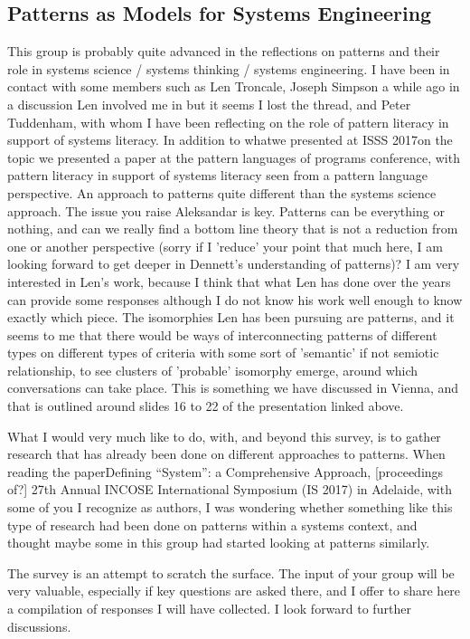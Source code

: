 \subsection{Patterns as Models for Systems Engineering}

This group is probably quite advanced in the reflections on patterns and their role in systems science / systems thinking / systems engineering. I have been in contact with some members such as Len Troncale, Joseph Simpson a while ago in a discussion Len involved me in but it seems I lost the thread, and Peter Tuddenham, with whom I have been reflecting on the role of pattern literacy in support of systems literacy. In addition to whatwe presented at ISSS 2017on the topic we presented a paper at the pattern languages of programs conference, with pattern literacy in support of systems literacy seen from a pattern language perspective. An approach to patterns quite different than the systems science approach.
The issue you raise Aleksandar is key. Patterns can be everything or nothing, and can we really find a bottom line theory that is not a reduction from one or another perspective (sorry if I 'reduce' your point that much here, I am looking forward to get deeper in Dennett's understanding of patterns)? I am very interested in Len's work, because I think that what Len has done over the years can provide some responses although I do not know his work well enough to know exactly which piece. The isomorphies Len has been pursuing are patterns, and it seems to me that there would be ways of interconnecting patterns of different types on different types of criteria with some sort of 'semantic' if not semiotic relationship, to see clusters of 'probable' isomorphy emerge, around which conversations can take place. This is something we have discussed in Vienna, and that is outlined around slides 16 to 22 of the presentation linked above.

What I would very much like to do, with, and beyond this survey, is to gather research that has already been done on different approaches to patterns. When reading the paperDefining “System”: a Comprehensive Approach, [proceedings of?] 27th Annual INCOSE International Symposium (IS 2017) in Adelaide, with some of you I recognize as authors, I was wondering whether something like this type of research had been done on patterns within a systems context, and thought maybe some in this group had started looking at patterns similarly.

The survey is an attempt to scratch the surface. The input of your group will be very valuable, especially if key questions are asked there, and I offer to share here a compilation of responses I will have collected. I look forward to further discussions.


